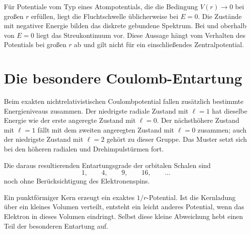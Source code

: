 Für Potentiale vom Typ eines Atompotentials, die die Bedingung \(V(r)\to0\) bei großen \(r\) erfüllen, liegt die Fluchtschwelle üblicherweise bei \(E=0\). Die Zustände mit negativer Energie bilden das diskrete gebundene Spektrum. Bei und oberhalb von \(E=0\) liegt das Streukontinuum vor. Diese Aussage hängt vom Verhalten des Potentials bei großen \(r\) ab und gilt nicht für ein einschließendes Zentralpotential.

\section{Die besondere Coulomb-Entartung}

Beim exakten nichtrelativistischen Coulombpotential fallen zusätzlich bestimmte Energieniveaus zusammen. Der niedrigste radiale Zustand mit \(\ell=1\) hat dieselbe Energie wie der erste angeregte Zustand mit \(\ell=0\). Der nächsthöhere Zustand mit \(\ell=1\) fällt mit dem zweiten angeregten Zustand mit \(\ell=0\) zusammen; auch der niedrigste Zustand mit \(\ell=2\) gehört zu dieser Gruppe. Das Muster setzt sich bei den höheren radialen und Drehimpulstürmen fort.

\begin{classroomqa}\end{classroomqa}

Die daraus resultierenden Entartungsgrade der orbitalen Schalen sind
\begin{equation}
1,\qquad 4,\qquad 9,\qquad 16,\qquad \ldots
\end{equation}
noch ohne Berücksichtigung des Elektronenspins.

\begin{classroomqa}\end{classroomqa}

Ein punktförmiger Kern erzeugt ein exaktes \(1/r\)-Potential. Ist die Kernladung über ein kleines Volumen verteilt, entsteht ein leicht anderes Potential, wenn das Elektron in dieses Volumen eindringt. Selbst diese kleine Abweichung hebt einen Teil der besonderen Entartung auf.

